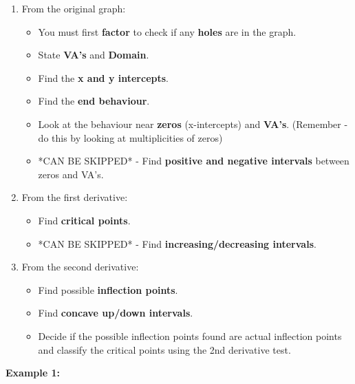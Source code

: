 \documentclass[12pt,fleqn]{book} %
\begin{document}
\begin{enumerate}
    \item From the original graph:
          \begin{itemize}
              \item You must first \textbf{factor} to check if any \textbf{holes} are in the graph.
              \item State \textbf{VA's} and \textbf{Domain}.
              \item Find the \textbf{x and y intercepts}.
              \item Find the \textbf{end behaviour}.
              \item Look at the behaviour near \textbf{zeros} (x-intercepts) and \textbf{VA's}. (Remember - do this by looking at multiplicities of zeros)
              \item *CAN BE SKIPPED* - Find \textbf{positive and negative intervals} between zeros and VA's.
          \end{itemize}

          \vspace*{4mm}

    \item From the first derivative:
          \begin{itemize}
              \item Find \textbf{critical points}.
              \item *CAN BE SKIPPED* - Find \textbf{increasing/decreasing intervals}.
          \end{itemize}

          \vspace*{4mm}

    \item From the second derivative:
          \begin{itemize}
              \item Find possible \textbf{inflection points}.
              \item Find \textbf{concave up/down intervals}.
              \item Decide if the possible inflection points found are actual inflection points and classify the critical points using the 2nd derivative test.
          \end{itemize}
\end{enumerate}

\pagebreak

\noindent \textbf{Example 1:}

\vspace*{4mm}
\end{document}

